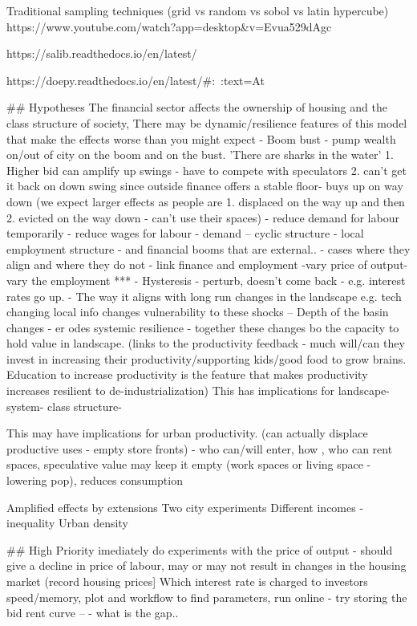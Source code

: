 Traditional sampling techniques (grid vs random vs sobol vs latin hypercube)
https://www.youtube.com/watch?app=desktop&v=Evua529dAgc


https://salib.readthedocs.io/en/latest/

https://doepy.readthedocs.io/en/latest/#:~:text=At%




## Hypotheses
The financial sector affects the ownership of housing and the class structure of society, 
There may be dynamic/resilience features of this model that make the effects worse than you might expect
- Boom bust - pump wealth on/out of city on the boom and on the bust. 'There are sharks in the water' 1. Higher bid can amplify up swings - have to compete with speculators 2. can't get it back on down swing since outside finance offers a stable floor- buys up on way down (we expect larger effects as people are 1. displaced on the way up and then 2. evicted on the way down - can't use their spaces)
  - reduce demand for labour temporarily - reduce wages for labour - demand -- cyclic structure - local employment structure - and financial booms that are external.. - cases where they align and where they do not
  - link finance and employment -vary price of output- vary the employment *** 
- Hysteresis - perturb, doesn't come back - e.g. interest rates go up.
- The way it aligns with long run changes in the landscape e.g. tech changing local info changes vulnerability to these shocks -- Depth of the basin changes - er   odes systemic resilience - together these changes bo the capacity to hold value in landscape. (links to the productivity feedback - much will/can they invest in increasing their productivity/supporting kids/good food to grow brains. Education to increase productivity is the feature that makes productivity increases resilient to de-industrialization)
This has implications for landscape- system- class structure- 

This may have implications for urban productivity. (can actually displace productive uses - empty store fronts) - who can/will enter, how , who can rent spaces, speculative value may keep it empty (work spaces or living space - lowering pop), reduces consumption


Amplified effects by extensions
Two city experiments
Different incomes  - inequality
Urban density



## High Priority
imediately do experiments with the price of output - should give a decline in price of labour, may or may not result in changes in the housing market (record housing prices]
Which interest rate is charged to investors
speed/memory, plot and workflow to find parameters, run online - try storing the bid rent curve -- - what is the gap.. 

